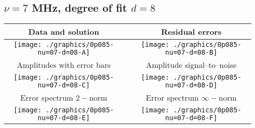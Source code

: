 

% 

\clearpage{}
\break{}

\subsection{$\nu = 7$ MHz, degree of fit $d = 8$}

\begin{table}[h]
    \begin{center}
        \begin{tabular}{ccc}
            Data and solution & \quad & Residual errors \\\hline
            \texttt{[image: ./graphics/0p085-nu=07-d=08-A]} &&
            \texttt{[image: ./graphics/0p085-nu=07-d=08-B]} \\[15pt]
            Amplitudes with error bars && Amplitude signal--to--noise \\\hline
            \texttt{[image: ./graphics/0p085-nu=07-d=08-C]} &&
            \texttt{[image: ./graphics/0p085-nu=07-d=08-D]} \\[15pt]
            Error spectrum $2-$norm && Error spectrum $\infty-$norm \\\hline
            \texttt{[image: ./graphics/0p085-nu=07-d=08-E]} &&
            \texttt{[image: ./graphics/0p085-nu=07-d=08-F]} \\[15pt]
        \end{tabular}
    \end{center}
\label{fig:elev=85, nu=7}
\end{table}



\endinput
